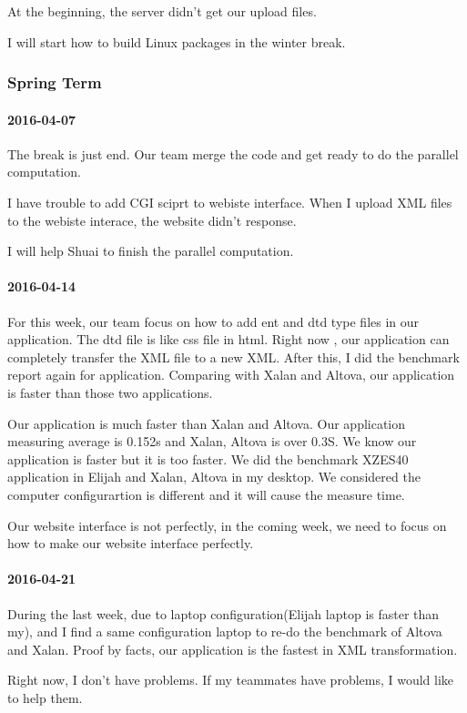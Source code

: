 At the beginning, the server didn't get our upload files.

I will start how to build Linux packages in the winter break.
\subsubsection{Spring Term}

\paragraph{2016-04-07}
The break is just end. Our team merge the code and get ready to do the parallel computation.

I have trouble to add CGI sciprt to webiste interface. When I upload XML files to the webiste interace, the website didn't response. 

I will help Shuai to finish the parallel computation. 
\paragraph{2016-04-14}
For this week, our team focus on how to add ent and dtd type files in our application. The dtd file is like css file in html. Right now , our application can completely transfer the XML file to a new XML. After this, I did the benchmark report again for application. Comparing with Xalan and Altova, our application is faster than those two applications.

Our application is much faster than Xalan and Altova. Our application measuring average is 0.152s and Xalan, Altova is over 0.3S. We know our application is faster but it is too faster. We did the benchmark XZES40 application in Elijah and Xalan, Altova in my desktop. We considered the computer configurartion is different and it will cause the measure time.

Our website interface is not perfectly, in the coming week, we need to focus on how to make our website interface perfectly.
\paragraph{2016-04-21}
During the last week, due to laptop configuration(Elijah laptop is faster than my), and I find a same configuration laptop to re-do the benchmark of Altova and Xalan. Proof by facts, our application is the fastest in XML transformation.

Right now, I don't have problems. If my teammates have problems, I would like to help them.

